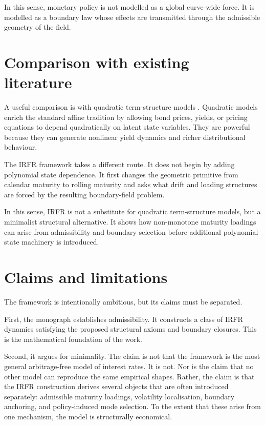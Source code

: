 \documentclass[11pt,oneside]{book}
\begin{document}
In this sense, monetary policy is not modelled as a global curve-wide
force. It is modelled as a boundary law whose effects are transmitted
through the admissible geometry of the field.

\section{Comparison with existing literature}\label{comparison-with-existing-literature}

A useful comparison is with quadratic term-structure models \cite{AhnDittmarGallant2002,LeippoldWu2002}. Quadratic
models enrich the standard affine tradition by allowing bond prices,
yields, or pricing equations to depend quadratically on latent state
variables. They are powerful because they can generate nonlinear yield
dynamics and richer distributional behaviour.

The IRFR framework takes a different route. It does not begin by adding
polynomial state dependence. It first changes the geometric primitive
from calendar maturity to rolling maturity and asks what drift and
loading structures are forced by the resulting boundary-field problem.

In this sense, IRFR is not a substitute for quadratic term-structure
models, but a minimalist structural alternative. It shows how
non-monotone maturity loadings can arise from admissibility and boundary
selection before additional polynomial state machinery is introduced.

\section{Claims and limitations}\label{claims-and-limitations}

The framework is intentionally ambitious, but its claims must be
separated.

First, the monograph establishes admissibility. It constructs a class of
IRFR dynamics satisfying the proposed structural axioms and boundary
closures. This is the mathematical foundation of the work.

Second, it argues for minimality. The claim is not that the framework is
the most general arbitrage-free model of interest rates. It is not. Nor
is the claim that no other model can reproduce the same empirical
shapes. Rather, the claim is that the IRFR construction derives several
objects that are often introduced separately: admissible maturity
loadings, volatility localisation, boundary anchoring, and
policy-induced mode selection. To the extent that these arise from one
mechanism, the model is structurally economical.
\end{document}
